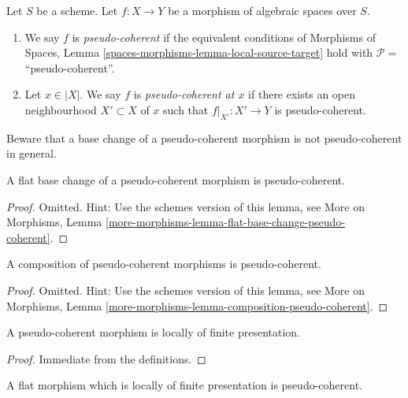 \begin{definition}
\label{definition-pseudo-coherent}
Let $S$ be a scheme.
Let $f : X \to Y$ be a morphism of algebraic spaces over $S$.
\begin{enumerate}
\item We say $f$ is {\it pseudo-coherent} if the equivalent conditions of
Morphisms of Spaces, Lemma \ref{spaces-morphisms-lemma-local-source-target}
hold with $\mathcal{P} =$``pseudo-coherent''.
\item Let $x \in |X|$. We say $f$ is {\it pseudo-coherent at $x$} if
there exists an open neighbourhood $X' \subset X$ of $x$ such
that $f|_{X'} : X' \to Y$ is pseudo-coherent.
\end{enumerate}
\end{definition}

\noindent
Beware that a base change of a pseudo-coherent morphism is not
pseudo-coherent in general.

\begin{lemma}
\label{lemma-flat-base-change-pseudo-coherent}
A flat base change of a pseudo-coherent morphism is pseudo-coherent.
\end{lemma}

\begin{proof}
Omitted. Hint: Use the schemes version of this lemma, see
More on Morphisms,
Lemma \ref{more-morphisms-lemma-flat-base-change-pseudo-coherent}.
\end{proof}

\begin{lemma}
\label{lemma-composition-pseudo-coherent}
A composition of pseudo-coherent morphisms is pseudo-coherent.
\end{lemma}

\begin{proof}
Omitted. Hint: Use the schemes version of this lemma, see
More on Morphisms,
Lemma \ref{more-morphisms-lemma-composition-pseudo-coherent}.
\end{proof}

\begin{lemma}
\label{lemma-pseudo-coherent-finite-presentation}
A pseudo-coherent morphism is locally of finite presentation.
\end{lemma}

\begin{proof}
Immediate from the definitions.
\end{proof}

\begin{lemma}
\label{lemma-flat-finite-presentation-pseudo-coherent}
A flat morphism which is locally of finite presentation is pseudo-coherent.
\end{lemma}

